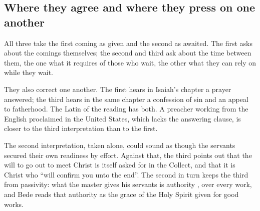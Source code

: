 \subsection{Where they agree and where they press on one another}

All three take the first coming as given and the second as awaited. The
first asks about the comings themselves; the second and third ask about the
time between them, the one what it requires of those who wait, the other
what they can rely on while they wait.

They also correct one another. The first hears in Isaiah's chapter a prayer
answered; the third hears in the same chapter a confession of sin and an
appeal to fatherhood. The Latin of the reading has both. A preacher working
from the English proclaimed in the United States, which lacks the answering
clause, is closer to the third interpretation than to the first.

The second interpretation, taken alone, could sound as though the servants
secured their own readiness by effort. Against that, the third points out that the will to go
out to meet Christ is itself asked for in the Collect, and that it is Christ
who ``will confirm you unto the end''. The second in turn keeps the third
from passivity: what the master gives his servants is authority , over every work, and Bede reads that authority as the grace of the
Holy Spirit given for good works.
